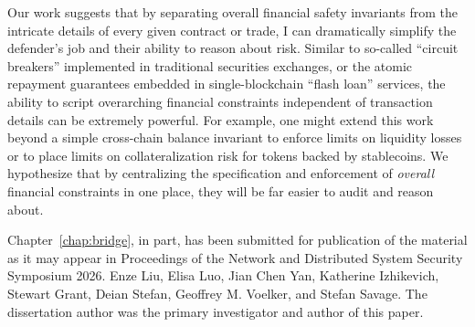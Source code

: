 Our work suggests that by separating overall financial safety
invariants from the intricate details of every given contract or
trade, I can dramatically simplify the defender's job and their
ability to reason about risk.  Similar to so-called ``circuit
breakers'' implemented in traditional securities exchanges, or the
atomic repayment guarantees embedded in single-blockchain ``flash
loan'' services, the ability to script overarching financial
constraints independent of transaction details can be extremely
powerful.  For example, one might extend this work beyond a simple
cross-chain balance invariant to enforce limits on liquidity losses or
to place limits on collateralization risk for tokens backed by
stablecoins.  We hypothesize that by centralizing the specification and
enforcement of \emph{overall} financial constraints in one place, they
will be far easier to audit and reason about.


Chapter~\ref{chap:bridge}, in part, has been submitted for publication of the material as it may appear in Proceedings of the Network and Distributed System Security Symposium 2026. Enze Liu, Elisa Luo, Jian Chen Yan, Katherine Izhikevich, Stewart Grant, Deian Stefan, Geoffrey M. Voelker, and Stefan Savage. The dissertation author was the primary investigator and author of this paper.


